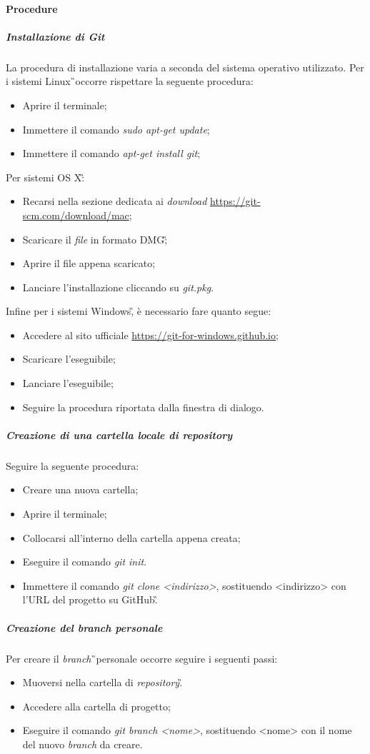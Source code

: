\paragraph{Procedure} 
\subparagraph{Installazione di Git} La procedura di installazione varia a seconda del sistema operativo utilizzato. Per i sistemi Linux\G\ occorre rispettare la seguente procedura:
\begin{itemize}
\item Aprire il terminale;
\item Immettere il comando \textit{sudo apt-get update};
\item Immettere il comando \textit{apt-get install git};
\end{itemize}
Per sistemi OS X\G:
\begin{itemize}
\item Recarsi nella sezione dedicata ai \textit{download} \url{https://git-scm.com/download/mac};
\item Scaricare il \textit{file} in formato DMG\G;
\item Aprire il file appena scaricato;
\item Lanciare l'installazione cliccando su\textit{ git.pkg}.
\end{itemize}
Infine per i sistemi Windows\G, è necessario fare quanto segue:
\begin{itemize}
\item Accedere al sito ufficiale \url{https://git-for-windows.github.io};
\item Scaricare l'eseguibile;
\item Lanciare l'eseguibile;
\item Seguire la procedura riportata dalla finestra di dialogo.
\end{itemize}

\subparagraph{Creazione di una cartella locale di repository} Seguire la seguente procedura:
\begin{itemize}
\item Creare una nuova cartella;
\item Aprire il terminale;
\item Collocarsi all'interno della cartella appena creata;
\item Eseguire il comando \textit{git init}.
\item Immettere il comando \textit{git clone <indirizzo>}, sostituendo <indirizzo> con l'URL del progetto su GitHub\G.
\end{itemize}

\subparagraph{Creazione del branch personale} Per creare il \textit{branch}\G\ personale occorre seguire i seguenti passi:
\begin{itemize}
\item Muoversi nella cartella di \textit{repository}\G.
\item Accedere alla cartella di progetto;
\item Eseguire il comando \textit{git branch <nome>}, sostituendo <nome> con il nome del nuovo \textit{branch} da creare.
\end{itemize}


